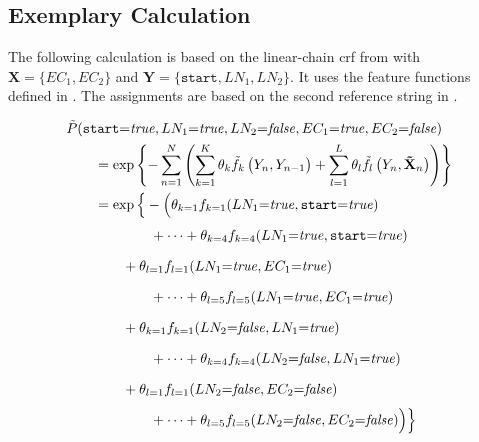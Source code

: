 \subsection{Exemplary Calculation}\label{app:subsec-lccrf-example-calculation}
The following calculation is based on the \gls{linear-chain crf} from  with $\mathbf{X}=\{EC_1,EC_2\}$ and $\mathbf{Y}=\{\texttt{start},LN_1,LN_2\}$.
It uses the \glspl{feature function} defined in .
The \glspl{assignment} are based on the second reference string in .

\begin{subequations}
\begin{equation*}
\begin{split}
  &\tilde{P}(\texttt{start}{=}\mathit{true},LN_1{=}\mathit{true},LN_2{=}\mathit{false},EC_1{=}\mathit{true},EC_2{=}\mathit{false})\\
  &\hspace{2em} = \exp\left\{ -\sum_{n=1}^N \left(\sum_{k=1}^K\theta_k \tilde{f}_k\left(\vphantom{\tilde{X}}Y_n,Y_{n-1}\right)+\sum_{l=1}^L\theta_l \tilde{f}_l\left(Y_n,\mathbf{\tilde{X}}_n\right)\right) \right\} \\
  &\hspace{2em} = \exp\Big\{-\Big(\theta_{k=1}f_{k=1}(LN_1{=}\mathit{true},\texttt{start}{=}\mathit{true})\\
  &\hspace{6em}\vphantom{\Big\{}+\cdots+\theta_{k=4}f_{k=4}(LN_1{=}\mathit{true},\texttt{start}{=}\mathit{true})\\
  &\hspace{4em}\vphantom{\Big\{}+\theta_{l=1}f_{l=1}(LN_1{=}\mathit{true},EC_1{=}\mathit{true})\\
  &\hspace{6em}\vphantom{\Big\{}+\cdots+\theta_{l=5}f_{l=5}(LN_1{=}\mathit{true},EC_1{=}\mathit{true})\\
  &\hspace{4em}\vphantom{\Big\{}+\theta_{k=1}f_{k=1}(LN_2{=}\mathit{false},LN_1{=}\mathit{true})\\
  &\hspace{6em}\vphantom{\Big\{}+\cdots+\theta_{k=4}f_{k=4}(LN_2{=}\mathit{false},LN_1{=}\mathit{true}) \\
  &\hspace{4em}\vphantom{\Big\{}+\theta_{l=1}f_{l=1}(LN_2{=}\mathit{false},EC_2{=}\mathit{false})\\
  &\hspace{6em}\vphantom{\Big\{}+\cdots+\theta_{l=5}f_{l=5}(LN_2{=}\mathit{false},EC_2{=}\mathit{false})\Big)\Big\}\\

\end{split}
\end{equation*}
\end{subequations}
